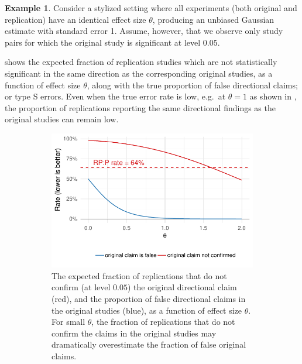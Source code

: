 \documentclass[11pt]{article}
\theoremstyle{definition}
\newtheorem{example}{Example}
\theoremstyle{custom}
\begin{document}
  \begin{example}
    \label{eg:sel-bias}
    Consider a stylized setting where all experiments (both original and replication) have an identical effect size $\theta$, producing an unbiased Gaussian estimate with standard error 1. Assume, however, that we observe only study pairs for which the original study is significant at level $0.05$.

     shows the expected fraction of replication studies which are not statistically significant in the same direction as the corresponding original studies, as a function of effect size $\theta$, along with the true proportion of false directional claims; or type S errors. Even when the true error rate is low, e.g.\ at $\theta = 1$ as shown in , the proportion of replications reporting the same directional findings as the original studies can remain low.
    \begin{figure}[htbp]
	    \centering
	    \begin{subfigure}[t]{0.59\hsize}
	      \centering
	      \includegraphics[width=\hsize]{naive-same-dir}
	      \caption{The expected fraction of replications that do not confirm (at level $0.05$) the original directional claim (red), and the proportion of false directional claims in the original studies (blue), as a function of effect size $\theta$. For small $\theta$, the fraction of replications that do not confirm the claims in the original studies may dramatically overestimate the fraction of false original claims.}
	    \label{fig:naive-same-dir-func}
	    \end{subfigure}
	    \hfill
	    \begin{subfigure}[t]{0.39\hsize}

\end{subfigure}
\end{figure}
\end{example}
\end{document}
